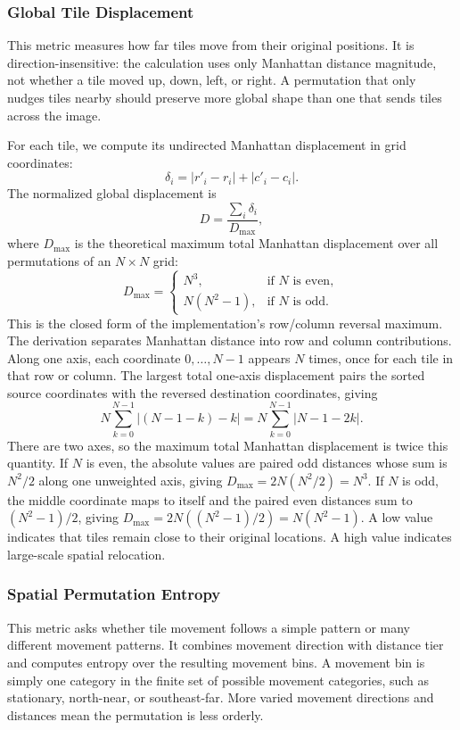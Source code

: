 \documentclass[12pt]{article}
\begin{document}
\subsubsection{Global Tile Displacement}

This metric measures how far tiles move from their original positions. It is direction-insensitive: the calculation uses only Manhattan distance magnitude, not whether a tile moved up, down, left, or right. A permutation that only nudges tiles nearby should preserve more global shape than one that sends tiles across the image.

For each tile, we compute its undirected Manhattan displacement in grid coordinates:
\[
\delta_i = |r'_i-r_i| + |c'_i-c_i|.
\]
The normalized global displacement is
\[
D = \frac{\sum_i \delta_i}{D_{\max}},
\]
where $D_{\max}$ is the theoretical maximum total Manhattan displacement over all permutations of an $N \times N$ grid:
\[
D_{\max} =
\begin{cases}
N^3, & \text{if } N \text{ is even}, \\
N(N^2 - 1), & \text{if } N \text{ is odd}.
\end{cases}
\]
This is the closed form of the implementation's row/column reversal maximum. The derivation separates Manhattan distance into row and column contributions. Along one axis, each coordinate $0,\ldots,N-1$ appears $N$ times, once for each tile in that row or column. The largest total one-axis displacement pairs the sorted source coordinates with the reversed destination coordinates, giving
\[
N \sum_{k=0}^{N-1} |(N-1-k)-k|
= N \sum_{k=0}^{N-1} |N-1-2k|.
\]
There are two axes, so the maximum total Manhattan displacement is twice this quantity. If $N$ is even, the absolute values are paired odd distances whose sum is $N^2/2$ along one unweighted axis, giving $D_{\max}=2N(N^2/2)=N^3$. If $N$ is odd, the middle coordinate maps to itself and the paired even distances sum to $(N^2-1)/2$, giving $D_{\max}=2N((N^2-1)/2)=N(N^2-1)$. A low value indicates that tiles remain close to their original locations. A high value indicates large-scale spatial relocation.

\subsubsection{Spatial Permutation Entropy}

This metric asks whether tile movement follows a simple pattern or many different movement patterns. It combines movement direction with distance tier and computes entropy over the resulting movement bins. A movement bin is simply one category in the finite set of possible movement categories, such as stationary, north-near, or southeast-far. More varied movement directions and distances mean the permutation is less orderly.
\end{document}
